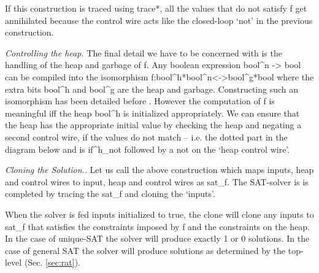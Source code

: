 \documentclass[preprint]{sigplanconf}
\newcommand{\xcomment}[2]{\textbf{#1:~\textsl{#2}}}
\newcommand{\roshan}[1]{\xcomment{Roshan}{#1}}
\begin{document}
If this construction is traced using {{trace*}}, all the values that
do not satisfy {{f}} get annihilated because the control wire acts
like the closed-loop `not' in the previous construction. 

\emph{Controlling the heap.}  The final detail we have to be concerned
with is the handling of the heap and garbage of {{f}}. Any boolean
expression {{bool^n -> bool}} can be compiled into the isomorphism
{{f:bool^h*bool^n<->bool^g*bool}} where the extra bits {{bool^h}} and
{{bool^g}} are the heap and garbage. Constructing such an isomorphism
has been detailed before \cite{Toffoli:1980,infeffects}.  However the
computation of {{f}} is meaningful {{iff}} the heap {{bool^h}} is
initialized appropriately. We can ensure that the heap has the
appropriate initial value by checking the heap and negating a second
control wire, if the values do not match -- i.e. the dotted part in
the diagram below and is {{if^h_{not} }} followed by a {{not}} on the
`heap control wire'.

\begin{center}
\end{center}  


\emph{Cloning the Solution.}.  Let us call the above construction
which maps inputs, heap and control wires to input, heap and control
wires as {{sat_f}}. The SAT-solver is is completed by tracing the
{{sat_f}} and cloning the `inputs'. 

\begin{center}
\end{center}  

When the solver is fed inputs initialized to {{true}}, the {{clone}}
will clone any inputs to {{sat_f}} that satisfies the constraints
imposed by {{f}} and the constraints on the {{heap}}. In the case of
unique-SAT the solver will produce exactly 1 or 0 solutions. In the
case of general SAT the solver will produce solutions as determined by
the top-level (Sec. \ref{sec:rat}).
\end{document}
